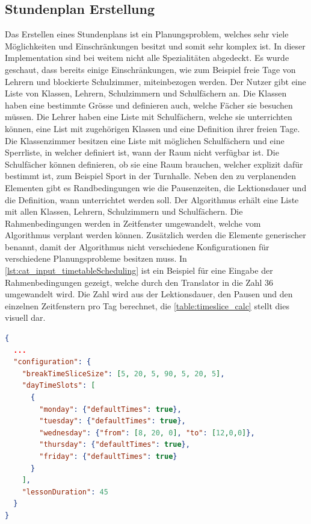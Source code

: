 \subsection{Stundenplan Erstellung}
Das Erstellen eines Stundenplans ist ein Planungsproblem, welches sehr viele Möglichkeiten und Einschränkungen besitzt und somit sehr komplex ist. In dieser Implementation sind bei weitem 
nicht alle Spezialitäten abgedeckt. Es wurde geschaut, dass bereits einige Einschränkungen, wie zum Beispiel freie Tage von Lehrern und blockierte Schulzimmer, miteinbezogen werden. 
Der Nutzer gibt eine Liste von Klassen, Lehrern, Schulzimmern und Schulfächern an. Die Klassen haben eine bestimmte Grösse und definieren auch, welche Fächer sie besuchen müssen. Die 
Lehrer haben eine Liste mit Schulfächern, welche sie unterrichten können, eine List mit zugehörigen Klassen und eine Definition ihrer freien Tage. Die Klassenzimmer besitzen eine Liste mit 
möglichen Schulfächern und eine Sperrliste, in welcher definiert ist, wann der Raum nicht verfügbar ist. Die Schulfächer können definieren, ob sie eine Raum brauchen, welcher explizit dafür 
bestimmt ist, zum Beispiel Sport in der Turnhalle. Neben den zu verplanenden Elementen gibt es Randbedingungen wie die Pausenzeiten, die Lektionsdauer und die Definition, 
wann unterrichtet werden soll. Der Algorithmus erhält eine Liste mit allen Klassen, Lehrern, Schulzimmern und Schulfächern. Die Rahmenbedingungen werden in Zeitfenster umgewandelt, 
welche vom Algorithmus verplant werden können. Zusätzlich werden die Elemente generischer benannt, damit der Algorithmus nicht verschiedene Konfigurationen für verschiedene 
Planungsprobleme besitzen muss. In \autoref{lst:cat_input_timetableScheduling} ist ein Beispiel für eine Eingabe der Rahmenbedingungen gezeigt, welche durch den Translator in die Zahl 36 
umgewandelt wird. Die Zahl wird aus der Lektionsdauer, den Pausen und den einzelnen Zeitfenstern pro Tag berechnet, die \autoref{table:timeslice_calc} stellt dies visuell dar.

\begin{lstlisting}[language=JSON, caption=Ausschnitt einer Eingabe für das Stundenplanproblem für die Rahmenbedingungen, label=lst:cat_input_timetableScheduling]  
{
  ...
  "configuration": {
    "breakTimeSliceSize": [5, 20, 5, 90, 5, 20, 5],
    "dayTimeSlots": [
      {
        "monday": {"defaultTimes": true},
        "tuesday": {"defaultTimes": true},
        "wednesday": {"from": [8, 20, 0], "to": [12,0,0]},
        "thursday": {"defaultTimes": true},
        "friday": {"defaultTimes": true}
      }
    ],
    "lessonDuration": 45
  }
}
\end{lstlisting}

